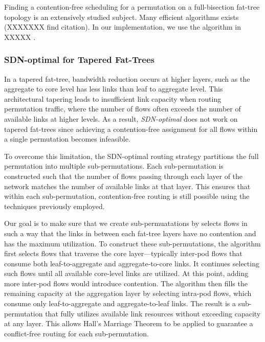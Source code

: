 Finding a contention-free scheduling for a permutation on a full-bisection
fat-tree topology is an extensively studied subject. Many efficient algorithms
exists \cite{} (XXXXXXX find citation). In our implementation, we use the
algorithm in XXXXX \cite{}.

\subsubsection{SDN-optimal for Tapered Fat-Trees}

In a tapered fat-tree, bandwidth reduction occurs at higher layers,
such as the aggregate to core level has less links than leaf to aggregate
level. This architectural tapering leads to insufficient link capacity
when routing permutation traffic, where the number of flows often
exceeds the number of available links at higher levels.
As a result, \textit{SDN-optimal} does not work on tapered fat-trees
since achieving a contention-free assignment for all flows within a
single permutation becomes infeasible.

To overcome this limitation, the SDN-optimal routing strategy
partitions the full permutation into multiple sub-permutations.
Each sub-permutation is constructed such that the number of flows
passing through each layer of the network matches the number of
available links at that layer. This ensures that within each
sub-permutation, contention-free routing is still possible using
the techniques previously employed.

Our goal is to make sure that we create sub-permuatations by
selects flows in such a way that the links in between each
fat-tree layers have no contention and has the maximum utilization. 
To construct these sub-permutations, the algorithm first selects
flows that traverse the core layer—typically inter-pod flows that consume both leaf-to-aggregate and aggregate-to-core links. It continues selecting such flows until all available core-level links are utilized. At this point, adding more inter-pod flows would introduce contention. The algorithm then fills the remaining capacity at the aggregation layer by selecting intra-pod flows, which consume only leaf-to-aggregate and aggregate-to-leaf links. The result is a sub-permutation that fully utilizes available link resources without exceeding capacity at any layer. This allows Hall’s Marriage Theorem to be applied to guarantee a conflict-free routing for each sub-permutation.

